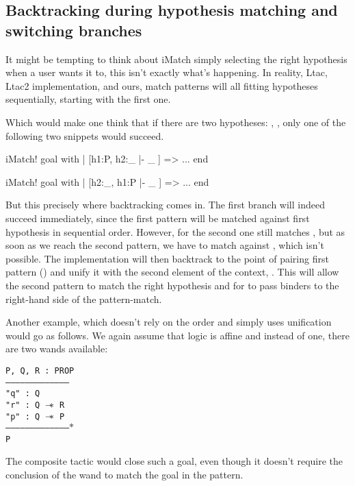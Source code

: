 \subsection{Backtracking during hypothesis matching and switching branches}

It might be tempting to think about iMatch simply selecting the right hypothesis when a user wants it to, this isn't exactly what's happening.
In reality, Ltac, Ltac2 implementation, and ours, match patterns will all fitting hypotheses sequentially, starting with the first one.

Which would make one think that if there are two hypotheses: , , only one of the following two snippets would succeed.
\begin{coq}
  iMatch! goal with
  | [h1:P, h2:_ |- _ ] => ...
  end
\end{coq}
\begin{coq}
  iMatch! goal with
  | [h2:_, h1:P |- _ ] => ...
  end
\end{coq}

But this precisely where backtracking comes in.
The first branch will indeed succeed immediately, since the first pattern will be matched against first hypothesis in sequential order.
However, for the second one  still matches \coqe{_}, but as soon as we reach the second pattern, we have to match  against , which isn't possible.
The implementation will then backtrack to the point of pairing first pattern (\coqe{_}) and unify it with the second element of the context, .
This will allow the second pattern to match the right hypothesis and for  to pass binders to the right-hand side of the pattern-match.

Another example, which doesn't rely on the order and simply uses unification would go as follows.
We again assume that logic is affine and instead of one, there are two wands available:

\begin{minipage}{\linewidth}
\texttt{P, Q, R : PROP\\
---------------------------------------\\
"q" : Q\\
"r" : Q $\mathrel{-\mkern-6mu*}$ R\\
"p" : Q $\mathrel{-\mkern-6mu*}$ P\\
--------------------------------------$\ast$\\
P
}
\end{minipage}

The composite tactic  would close such a goal, even though it doesn't require the conclusion of the wand to match the goal in the pattern.

